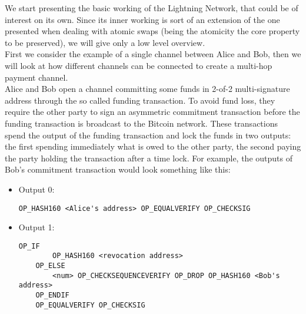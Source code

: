 We start presenting the basic working of the Lightning Network, that could be of interest on its own. Since its inner working is sort of an extension of the one presented when dealing with atomic swaps (being the atomicity the core property to be preserved), we will give only a low level overview.
\\
First we consider the example of a single channel between Alice and Bob, then we will look at how different channels can be connected to create a multi-hop payment channel.
\\
Alice and Bob open a channel committing some funds in 2-of-2 multi-signature address through the so called funding transaction. To avoid fund loss, they require the other party to sign an asymmetric commitment transaction before the funding transaction is broadcast to the Bitcoin network. These transactions spend the output of the funding transaction and lock the funds in two outputs: the first spending immediately what is owed to the other party, the second paying the party holding the transaction after a time lock. For example, the outputs of Bob's commitment transaction would look something like this:
\begin{itemize}
\item Output 0:
	\begin{lstlisting}[frame=single]
	OP_HASH160 <Alice's address> OP_EQUALVERIFY OP_CHECKSIG\end{lstlisting}
	
\item Output 1:
	\begin{lstlisting}[frame=single]
	OP_IF
		OP_HASH160 <revocation address>
	OP_ELSE
		<num> OP_CHECKSEQUENCEVERIFY OP_DROP OP_HASH160 <Bob's address> 
	OP_ENDIF
	OP_EQUALVERIFY OP_CHECKSIG\end{lstlisting}
\end{itemize}
